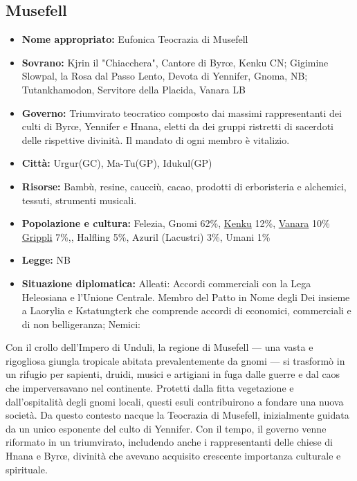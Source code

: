 \documentclass[10pt, a4paper]{report}
\begin{document}
\begin{multicols}{2}
\subsection*{Musefell}
\begin{itemize}
	\item \textbf{Nome appropriato:} Eufonica Teocrazia di Musefell
	\item \textbf{Sovrano:} Kjrin il "Chiacchera", Cantore di Byrœ, Kenku CN; Gigimine Slowpal, la Rosa dal Passo Lento, Devota di Yennifer, Gnoma, NB; Tutankhamodon, Servitore della Placida, Vanara LB
	\item \textbf{Governo:} Triumvirato teocratico composto dai massimi rappresentanti dei culti di Byrœ, Yennifer e Hnana, eletti da dei gruppi ristretti di sacerdoti delle rispettive divinità. Il mandato di ogni membro è vitalizio. 
	\item \textbf{Città:} Urgur(GC), Ma-Tu(GP), Idukul(GP)
	\item \textbf{Risorse:} Bambù, resine, caucciù, cacao, prodotti di erboristeria e alchemici, tessuti, strumenti musicali.
	\item \textbf{Popolazione e cultura:} Felezia, Gnomi 62\%, \href{https://srd.dndtools.org/srd/races/racesMm3.html#kenkus}{Kenku} 12\%,  \href{https://srd.dndtools.org/srd/races/racesOa.html#vanaras}{Vanara} 10\% \href{https://srd.dndtools.org/srd/races/racesDramag.html#grippli}{Grippli} 7\%,, Halfling 5\%, Azuril (Lacustri) 3\%, Umani 1\%
	\item \textbf{Legge:} NB
	\item \textbf{Situazione diplomatica:} Alleati: Accordi commerciali con la Lega Heleosiana e l'Unione Centrale.  Membro del Patto in Nome degli Dei insieme a Laorylia e Kstatungterk che comprende accordi di economici, commerciali e di non belligeranza; Nemici: 
\end{itemize}
Con il crollo dell’Impero di Unduli, la regione di Musefell — una vasta e rigogliosa giungla tropicale abitata prevalentemente da gnomi — si trasformò in un rifugio per sapienti, druidi, musici e artigiani in fuga dalle guerre e dal caos che imperversavano nel continente. Protetti dalla fitta vegetazione e dall'ospitalità degli gnomi locali, questi esuli contribuirono a fondare una nuova società. Da questo contesto nacque la Teocrazia di Musefell, inizialmente guidata da un unico esponente del culto di Yennifer. Con il tempo, il governo venne riformato in un triumvirato, includendo anche i rappresentanti delle chiese di Hnana e Byrœ, divinità che avevano acquisito crescente importanza culturale e spirituale.

\end{multicols}
\end{document}
